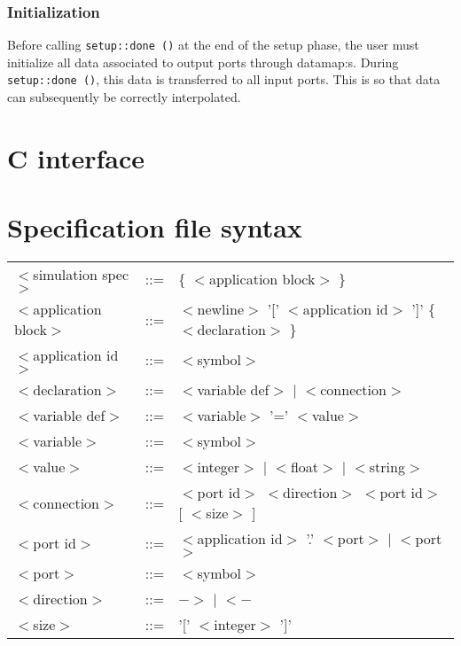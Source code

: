 \documentclass[a4paper]{report}
\begin{document}
\subsection{Initialization}

Before calling \verb|setup::done ()| at the end of the setup phase,
the user must initialize all data associated to output ports through
datamap:s.  During \verb|setup::done ()|, this data is transferred to
all input ports.  This is so that data can subsequently be correctly
interpolated.

\appendix

\chapter{C interface}

\chapter{Specification file syntax}

\newcommand{\nt}[1]{$<$#1$>$}

\begin{tabular}{lcl}
\nt{simulation spec}   & ::= & \{ \nt{application block} \} \\
\nt{application block} & ::= & \nt{newline} '[' \nt{application id} ']' \{ \nt{declaration}
\} \\
\nt{application id}    & ::= & \nt{symbol} \\
\nt{declaration}       & ::= & \nt{variable def} $|$ \nt{connection} \\
\nt{variable def}      & ::= & \nt{variable} '=' \nt{value} \\
\nt{variable}	       & ::= & \nt{symbol} \\
\nt{value} 	       & ::= & \nt{integer} $|$ \nt{float} $|$ \nt{string} \\
\nt{connection}	       & ::= & \nt{port id} \nt{direction} \nt{port id} [ \nt{size} ] \\
\nt{port id}	       & ::= & \nt{application id} '.' \nt{port} $|$
\nt{port} \\
\nt{port}	       & ::= & \nt{symbol} \\
\nt{direction}	       & ::= & $->$ $|$ $<-$ \\
\nt{size}	       & ::= & '[' \nt{integer} ']' \\
\end{tabular}

\printindex
\end{document}
